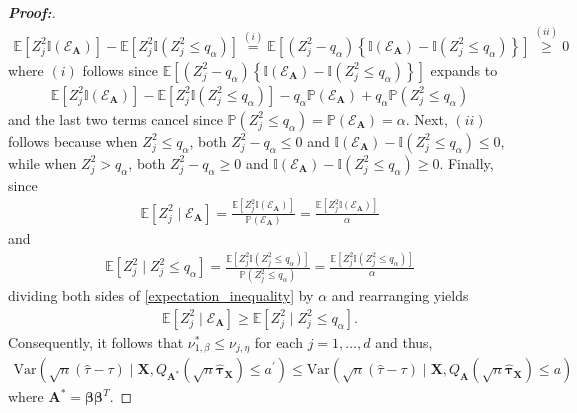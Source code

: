 \documentclass[11pt,twoside]{article}
\theoremstyle{definition}
\theoremstyle{remark}
\begin{document}
\begin{proof}[\textbf{Proof:}]
\begin{align}
         \mathbb{E}\left[Z^2_j \mathbb{I}(\mathcal{E}_{\mathbf{A}})\right] - \mathbb{E}\left[Z^2_j\mathbb{I}(Z^2_j\leq q_\alpha)\right] \overset{(i)}{=} \mathbb{E}\left[(Z^2_j-q_\alpha) \left\{ \mathbb{I}(\mathcal{E}_{\mathbf{A}}) -\mathbb{I}(Z^2_j\leq q_\alpha) \right\} \right] \overset{(ii)}{\geq} 0
    \end{align}
    where $(i)$ follows since $\mathbb{E}\left[(Z^2_j-q_\alpha) \left\{ \mathbb{I}(\mathcal{E}_{\mathbf{A}}) -\mathbb{I}(Z^2_j\leq q_\alpha) \right\} \right]$ expands to
    \begin{align*}
         \mathbb{E}\left[Z^2_j \mathbb{I}(\mathcal{E}_{\mathbf{A}})\right] - \mathbb{E}\left[Z^2_j\mathbb{I}(Z^2_j\leq q_\alpha)\right] - q_\alpha \mathbb{P}(\mathcal{E}_{\mathbf{A}}) + q_\alpha \mathbb{P}(Z^2_j\leq q_\alpha)
    \end{align*}
    and the last two terms cancel since $\mathbb{P}(Z^2_j\leq q_\alpha) = \mathbb{P}(\mathcal{E}_{\mathbf{A}}) = \alpha$. Next, $(ii)$ follows because when $Z^2_j \leq q_\alpha$, both $Z^2_j -q_\alpha\leq0$ and $\mathbb{I}(\mathcal{E}_{\mathbf{A}})-\mathbb{I}(Z^2_j\leq q_\alpha)\leq0$, while when $Z^2_j > q_\alpha$, both $Z^2_j -q_\alpha\geq0$ and $\mathbb{I}(\mathcal{E}_{\mathbf{A}}) -\mathbb{I}(Z^2_j \leq q_\alpha)\geq0$. Finally, since
    \begin{align*}
        \mathbb{E}[Z^2_j \mid \mathcal{E}_{\mathbf{A}}] = \frac{\mathbb{E}[Z^2_j \mathbb{I}(\mathcal{E}_{\mathbf{A}})]}{\mathbb{P}(\mathcal{E}_{\mathbf{A}})} = \frac{\mathbb{E}[Z^2_j \mathbb{I}(\mathcal{E}_{\mathbf{A}})]}{\alpha}
    \end{align*}
    and
    \begin{align*}
        \mathbb{E}[Z^2_j \mid Z^2_j \leq q_\alpha] = \frac{\mathbb{E}[Z^2_j \mathbb{I}(Z^2_j \leq q_\alpha)]}{\mathbb{P}(Z^2_j \leq q_\alpha)} = \frac{\mathbb{E}[Z^2_j \mathbb{I}(Z^2_j \leq q_\alpha)]}{\alpha}
    \end{align*}
    dividing both sides of \cref{expectation_inequality} by $\alpha$ and rearranging yields
    \begin{align*}
        \mathbb{E}[Z^2_j \mid \mathcal{E}_{\mathbf{A}}] \geq \mathbb{E}[Z^2_j \mid Z^2_j \leq q_\alpha]. 
    \end{align*}
    Consequently, it follows that $\nu^*_{1, \beta} \leq \nu_{j, \eta}$ for each $j = 1, \ldots, d$ and thus,
    \begin{align*}
    \text{Var}(\sqrt{n}(\widehat{\tau} - \tau)\mid \mathbf{X}, Q_{\mathbf{A}^*}(\sqrt{n} \widehat{\bm{\tau}}_{\mathbf{X}}) \leq a^\prime) \leq \text{Var}(\sqrt{n}(\widehat{\tau} - \tau) \mid \mathbf{X}, Q_{\mathbf{A}}(\sqrt{n} \widehat{\bm{\tau}}_{\mathbf{X}}) \leq a)
    \end{align*}
    where $\mathbf{A}^* = \bm{\beta}\bm{\beta}^T$.
    

\end{proof}
\end{document}
